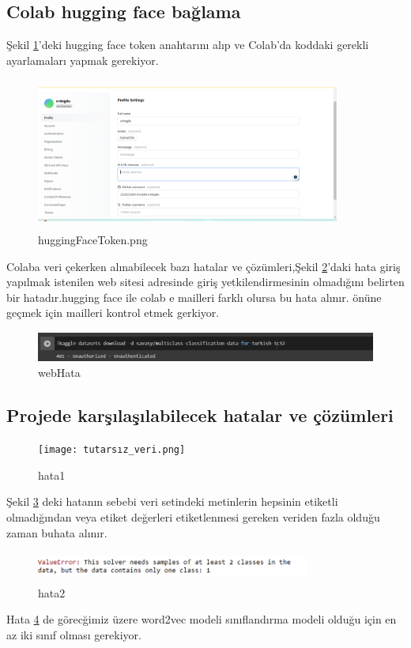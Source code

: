\documentclass[12pt, a4paper]{article}
\begin{document}
{{			\subsection{Colab hugging face bağlama}
			Şekil \ref{huggingFaceToken}'deki hugging face token anahtarını alıp ve Colab'da koddaki gerekli ayarlamaları yapmak gerekiyor.
			\begin{figure}
				\centering
				\includegraphics[width=10cm,height=5cm]{huggingFaceToken.png}
				\caption{huggingFaceToken.png}
				\label{huggingFaceToken}
			\end{figure}
			\newpage
			
			Colaba veri çekerken alınabilecek bazı hatalar ve çözümleri,Şekil \ref{webHata}'daki hata giriş yapılmak istenilen web sitesi adresinde giriş yetkilendirmesinin olmadığını belirten bir hatadır.hugging face ile colab e mailleri farklı olursa bu hata alınır. önüne geçmek için mailleri kontrol etmek gerkiyor.
			\\
			
			\begin{figure}
				\centering
				\includegraphics[width=16cm,height=1cm]{webHata.png}
				\caption{webHata\cite{github}}
				\label{webHata}
			\end{figure}
			
			\subsection{Projede karşılaşılabilecek hatalar ve çözümleri}
			\begin{figure}[h]
				\centering
				\texttt{[image: tutarsız\_veri.png]}
				\caption{hata1}
				\label{hata1}
			\end{figure}
			Şekil \ref{hata1} deki hatanın sebebi veri setindeki metinlerin hepsinin etiketli olmadığından veya etiket değerleri etiketlenmesi gereken veriden fazla olduğu zaman buhata alınır.
			\begin{figure}[h]
				\centering
				\includegraphics[width=9cm,height=1cm]{verisetiDegerleri.png}
				\caption{hata2}
				\label{hata2}
			\end{figure}	
			Hata \ref{hata2} de görecğimiz üzere word2vec modeli sınıflandırma modeli olduğu için en az iki sınıf olması gerekiyor.
			
}}
\end{document}
